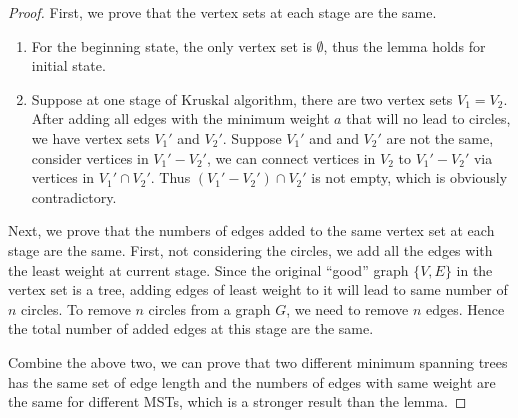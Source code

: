 \documentclass[12pt, notitlepage]{article}
\begin{document}
\begin{enumerate}[1.]
\begin{proof}
First, we prove that the vertex sets at each stage are the same.
\begin{enumerate}[(1)]
\item For the beginning state, the only vertex set is $\emptyset$, thus the lemma holds for initial state.
\item Suppose at one stage of Kruskal algorithm, there are two vertex sets $V_1 = V_2$. After adding all edges with the minimum weight $a$ that will no lead to circles, we have vertex sets ${V_1}'$ and ${V_2}'$. Suppose ${V_1}'$ and and ${V_2}'$ are not the same, consider vertices in  ${V_1}' - {V_2}'$, we can connect vertices in $V_2$ to ${V_1}' - {V_2}'$ via vertices in ${V_1}'\cap {V_2}'$. Thus $({V_1}' - {V_2}')\cap {V_2}'$ is not empty, which is obviously contradictory.
\end{enumerate}
Next, we prove that the numbers of edges added to the same vertex set at each stage are the same. First, not considering the circles, we add all the edges with the least weight at current stage. Since the original ``good'' graph $\{V, E\}$ in the vertex  set is a tree, adding edges of least weight to it will lead to same number of $n$ circles. To remove $n$ circles from a graph $G$, we need to remove $n$ edges. Hence the total number of added edges at this stage are the same.

Combine the above two, we can prove that two different minimum spanning trees has the same set of edge length and the numbers of edges with same weight are the same for different MSTs, which is a stronger result than the lemma.
\end{proof}
\end{enumerate}
\end{document}
